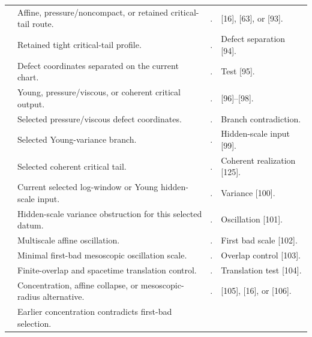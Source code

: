\documentclass[11pt]{amsart}
\numberwithin{equation}{section}
\theoremstyle{plain}
\theoremstyle{definition}
\theoremstyle{remark}
\begin{document}
\begin{longtable}{@{}L{0.06\textwidth}L{0.25\textwidth}L{0.40\textwidth}L{0.21\textwidth}@{}}
\relax
[92] & Affine, pressure/noncompact, or retained critical-tail route. &
. & [16], [63], or [93].\\
\relax
[93] & Retained tight critical-tail profile. &
. & Defect separation [94].\\
\relax
[94] & Defect coordinates separated on the current chart. &
. & Test [95].\\
\relax
[95] & Young, pressure/viscous, or coherent critical output. &
. & [96]--[98].\\
\relax
[96] & Selected pressure/viscous defect coordinates. &
. & Branch contradiction.\\
\relax
[97] & Selected Young-variance branch. &
. & Hidden-scale input [99].\\
\relax
[98] & Selected coherent critical tail. &
. & Coherent realization [125].\\
\relax
[99] & Current selected log-window or Young hidden-scale input. &
. & Variance [100].\\
\relax
[100] & Hidden-scale variance obstruction for this selected datum. &
. & Oscillation [101].\\
\relax
[101] & Multiscale affine oscillation. &
. & First bad scale [102].\\
\relax
[102] & Minimal first-bad mesoscopic oscillation scale. &
. & Overlap control [103].\\
\relax
[103] & Finite-overlap and spacetime translation control. &
. & Translation test [104].\\
\relax
[104] & Concentration, affine collapse, or mesoscopic-radius alternative. &
. & [105], [16], or [106].\\
\relax
[105] & Earlier concentration contradicts first-bad selection. &

\end{longtable}
\end{document}
